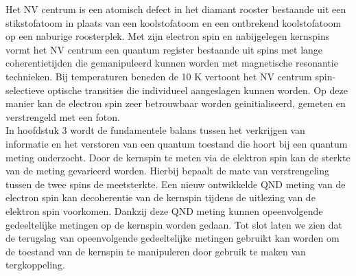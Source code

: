 Het NV centrum is een atomisch defect in het diamant rooster bestaande uit een stikstofatoom in plaats van een koolstofatoom en een ontbrekend koolstofatoom op een naburige roosterplek. Met zijn electron spin en nabijgelegen kernspins vormt het NV centrum een quantum register bestaande uit spins met lange coherentietijden die gemanipuleerd kunnen worden met magnetische resonantie technieken. Bij temperaturen beneden de 10 K vertoont het NV centrum spin-selectieve optische transities die individueel aangeslagen kunnen worden. Op deze manier kan de electron spin zeer betrouwbaar worden geinitialiseerd, gemeten en verstrengeld met een foton. \\

In hoofdstuk 3 wordt de fundamentele balans tussen het verkrijgen van informatie en het verstoren van een quantum toestand die hoort bij een quantum meting onderzocht. Door de kernspin te meten via de elektron spin kan de sterkte van de meting gevarieerd worden. Hierbij bepaalt de mate van verstrengeling tussen de twee spins de meetsterkte. Een nieuw ontwikkelde QND meting van de electron spin kan decoherentie van de kernspin tijdens de uitlezing van de elektron spin voorkomen. Dankzij deze QND meting kunnen opeenvolgende gedeeltelijke metingen op de kernspin worden gedaan. Tot slot laten we zien dat de terugslag van opeenvolgende gedeeltelijke metingen gebruikt kan worden om de toestand van de kernspin te manipuleren door gebruik te maken van tergkoppeling.

